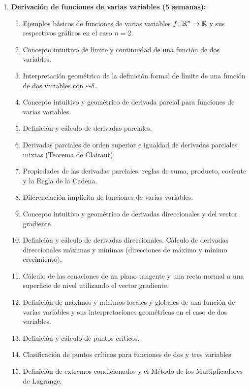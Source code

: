 \begin{refsection}
\begin{enumerate}
\item \textbf{Derivación de funciones de varias variables (5 semanas):} 
\begin{enumerate}
    \item Ejemplos básicos de funciones de varias variables $f \colon \mathbb{R}^n \to \mathbb{R}$ y sus respectivos gráficos en el caso $n = 2$. 
    \item Concepto intuitivo de límite y continuidad de una función de dos variables.
    \item Interpretación geométrica de la definición formal de límite de una función de dos variables con $\varepsilon$-$\delta$.
    \item Concepto intuitivo y geométrico de derivada parcial para funciones de varias variables.
    \item Definición y cálculo de derivadas parciales.
    \item Derivadas parciales de orden superior e igualdad de derivadas parciales mixtas (Teorema de Clairaut).
    \item Propiedades de las derivadas parciales: reglas de suma, producto, cociente y la Regla de la Cadena.
    \item Diferenciación implícita de funciones de varias variables.
    \item Concepto intuitivo y geométrico de derivadas direccionales y del vector gradiente.
    \item Definición y cálculo de derivadas direccionales. Cálculo de derivadas direccionales máximas y mínimas (direcciones de máximo y mínimo crecimiento).
    \item Cálculo de las ecuaciones de un plano tangente y una recta normal a una superficie de nivel utilizando el vector gradiente.
    \item Definición de máximos y mínimos locales y globales de una función de varias variables y sus interpretaciones geométricas en el caso de dos variables.
    \item Definición y cálculo de puntos críticos.
    \item Clasificación de puntos críticos para funciones de dos y tres variables.
    \item Definición de extremos condicionados y el Método de los Multiplicadores de Lagrange.
\end{enumerate}


\end{enumerate}
\end{refsection}
